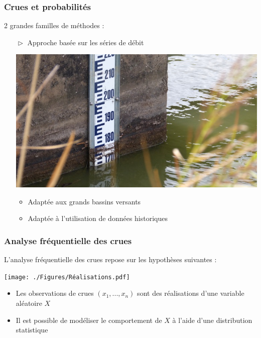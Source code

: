 \documentclass[compress,9pt]{beamer}
\begin{document}
	\begin{frame}[c]
		\frametitle{Crues et probabilités}
      	2 grandes familles de méthodes : \newline
		\begin{center}
			\begin{itemize}
				\centering
      			\item[$\vartriangleright$] Approche basée sur les séries de débit
      			\vspace{5pt}
      			\begin{center}
      				\includegraphics[width = .6\textwidth]{./Figures/EchelleLimni.jpg} 
      			\end{center}	
				\begin{itemize}
					\centering
      				\item<2->[$\checkmark$] \normalsize{Adaptée aux grands bassins versants}
      				\vspace{5pt}
      				\item<3->[$\checkmark$] \normalsize{Adaptée à l'utilisation de données historiques}
      			\end{itemize}		
      		\end{itemize}		
		\end{center}
	\end{frame}
	
		
	\begin{frame}%
		\frametitle{Analyse fréquentielle des crues}
		L'analyse fréquentielle des crues repose sur les hypothèses suivantes : 
      	\vspace{3pt}			
		\begin{center}
			\texttt{[image: ./Figures/Réalisations.pdf]} 
		\end{center}
		\vspace{5pt}
		\begin{itemize}
			\item<2->[$\vartriangleright$] Les observations de crues $(x_1,...,x_n)$ sont des réalisations d'une variable aléatoire $X$ 
			\vspace{5pt}
			\item<3->[$\vartriangleright$] Il est possible de modéliser le comportement de $X$ à l'aide d'une distribution statistique 
		\end{itemize}
		\centering
	\end{frame}
\end{document}
